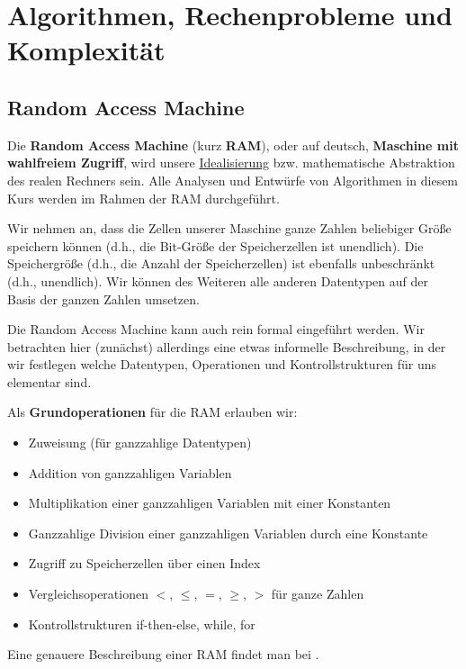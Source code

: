 \section{Algorithmen, Rechenprobleme und Komplexität}

\subsection{Random Access Machine}
\label{sect:RAM}

\begin{bem} 
Die \textbf{Random Access Machine} (kurz \textbf{RAM}), oder auf deutsch, \textbf{Maschine mit wahlfreiem Zugriff}, wird unsere \underline{Idealisierung} bzw. mathematische Abstraktion des realen Rechners sein. Alle Analysen und Entwürfe von Algorithmen in diesem Kurs werden im Rahmen der RAM durchgeführt. 

Wir nehmen an, dass die Zellen unserer Maschine ganze Zahlen beliebiger Größe speichern können (d.h., die Bit-Größe der Speicherzellen ist unendlich). Die Speichergröße (d.h., die Anzahl der Speicherzellen) ist ebenfalls unbeschränkt (d.h., unendlich). Wir können des Weiteren alle anderen Datentypen auf der Basis der ganzen Zahlen umsetzen. 

Die Random Access Machine kann auch rein formal eingeführt werden. Wir betrachten hier (zunächst) allerdings eine etwas informelle Beschreibung, in der wir festlegen welche Datentypen, Operationen und Kontrollstrukturen für uns elementar sind. 

Als \textbf{Grundoperationen} für die RAM erlauben wir:
%
\begin{itemize}
	\item Zuweisung (für ganzzahlige Datentypen)
	\item Addition von ganzzahligen Variablen
	\item Multiplikation einer ganzzahligen Variablen mit einer Konstanten
	\item Ganzzahlige Division einer ganzzahligen Variablen durch eine Konstante
	\item Zugriff zu Speicherzellen über einen Index
	\item Vergleichsoperationen $<$, $\le$, $=$, $\ge$, $>$ für ganze Zahlen
	\item Kontrollstrukturen if-then-else, while, for 
\end{itemize}

Eine genauere Beschreibung einer RAM findet man bei \cite[Sect.~1.3]{Lov20}.
\end{bem} 

